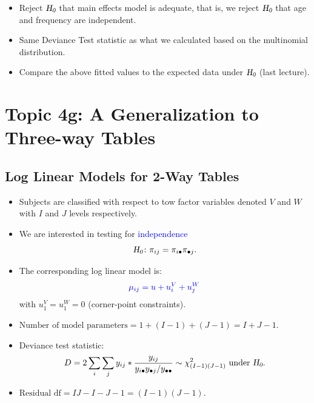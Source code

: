 \documentclass{article}\usepackage[]{graphicx}\usepackage[svgnames]{xcolor}
\let\log\relax%
\newcommand{\HN}{\textsl{H}_{\textsl{0}}}%
\begin{document}
\begin{itemize}
      \item Reject $ \HN $ that main effects model is adequate, that is, we reject $ \HN $
            that age and frequency are independent.
      \item Same Deviance Test statistic as what we calculated based on the multinomial
            distribution.
      \item Compare the above fitted values to the expected data under $ \HN $ (last lecture).
\end{itemize}

\section*{Topic 4g: A Generalization to Three-way Tables}
\subsection*{Log Linear Models for 2-Way Tables}
\begin{itemize}
      \item Subjects are classified with respect to tow factor variables denoted $V$ and $W$ with
            $I$ and $J$ levels respectively.
      \item We are interested in testing for \textcolor{Blue}{independence}
            \[ \HN\colon \pi_{ij}=\pi_{i\bullet}\pi_{\bullet j}. \]
      \item The corresponding log linear model is:
            \[ \textcolor{Blue}{\log{\mu_{ij}}=u+u_i^V+u_j^W} \]
            with $ u_1^V=u_1^W=0 $ (corner-point constraints).
      \item $ \text{Number of model parameters}=1+(I-1)+(J-1)=I+J-1 $.
      \item Deviance test statistic:
            \[ D=2\sum_i\sum_j y_{ij}\log*{\frac{y_{ij}}{y_{i\bullet}y_{\bullet j}/y_{\bullet\bullet}}} \sim \chi^2_{(I-1)(J-1)}\text{ under $ \HN $}. \]
      \item $ \text{Residual df}=IJ-I-J-1=(I-1)(J-1) $.
\end{itemize}
\end{document}
